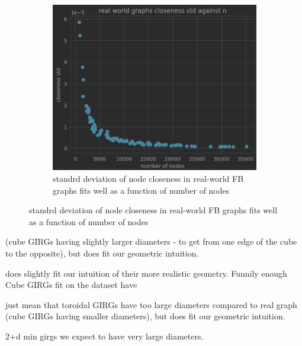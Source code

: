 \begin{figure}
\begin{subfigure}{0.49\textwidth}
    \end{subfigure}
    \begin{subfigure}{0.49\textwidth}
    \includegraphics[width=\linewidth]{./figures/real_closeness_std_against_n.png}
    \caption{standrd deviation of node closeness in real-world FB graphs fits well as a function of number of nodes}
    \end{subfigure}
\end{figure}

(cube GIRGs having slightly larger diameters - to get from one edge of the cube to the opposite), but does fit our geometric intuition.


does slightly fit our intuition of their more realistic geometry. Funnily enough Cube GIRGs fit on the dataset have 

just mean that toroidal GIRGs have too large diameters compared to real graph (cube GIRGs having smaller diameters), but does fit our geometric intuition.

2+d min girgs we expect to have very large diameters.




